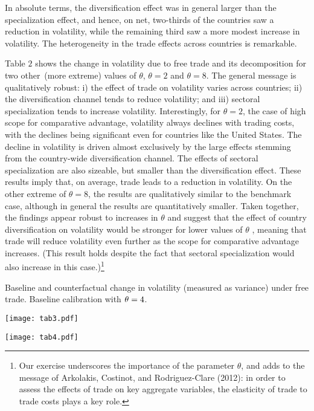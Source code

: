 \documentclass[12pt]{article}
\begin{document}
In absolute terms, the diversification effect was in general larger than the
specialization effect, and hence, on net, two-thirds of the countries saw a
reduction in volatility, while the remaining third saw a more modest
increase in volatility. The heterogeneity in the trade effects across
countries is remarkable.

Table $2$ shows the change in volatility due to free trade and its
decomposition for two other\ (more extreme) values of $\theta $, $\theta =2$
and $\theta =8.$ The general message is qualitatively robust: i) the effect
of trade on volatility varies across countries; ii) the diversification
channel tends to reduce volatility; and iii) sectoral specialization tends
to increase volatility. Interestingly, for $\theta =2$, the case of high
scope for comparative advantage, volatility always declines with trading
costs, with the declines being significant even for countries like the
United States. The decline in volatility is driven almost exclusively by the
large effects stemming from the country-wide diversification channel. The
effects of sectoral specialization are also sizeable, but smaller than the
diversification effect. These results imply that, on average, trade leads to
a reduction in volatility. On the other extreme of $\theta =8$, the results
are qualitatively similar to the benchmark case, although in general the
results are quantitatively smaller. Taken together, the findings appear
robust to increases in $\theta $ and suggest that the effect of country
diversification on volatility would be stronger for lower values of $\theta $%
, meaning that trade will reduce volatility even further as the scope for
comparative advantage increases. (This result holds despite the fact that
sectoral specialization would also increase in this case.)\footnote{%
Our exercise underscores the importance of the parameter $\theta $, and adds
to the message of Arkolakis, Costinot, and Rodriguez-Clare (2012): in order
to assess the effects of trade on key aggregate variables, the elasticity of
trade to trade costs plays a key role.}

\begin{table}[ph]
\caption{Baseline and counterfactual change in volatility (measured as
variance) under free trade. Baseline calibration with $\protect\theta =4$.}%
\centering\texttt{[image: tab3.pdf]}
\end{table}

\begin{table}[ph]
\caption{Counterfactual change in volatility (measured as variance) under
free trade. Alternative calibrations with $\protect\theta =2$ and $\protect%
\theta =8$.}\centering\texttt{[image: tab4.pdf]}
\end{table}
\end{document}
